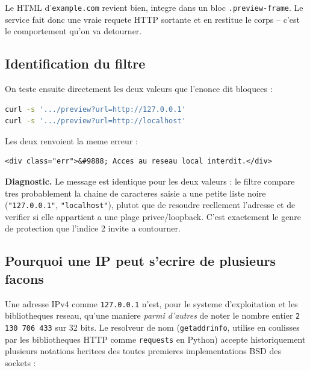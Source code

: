 \documentclass[11pt,a4paper]{article}
\begin{document}
Le HTML d'\texttt{example.com} revient bien, integre dans un bloc
\texttt{.preview-frame}. Le service fait donc une vraie requete HTTP
sortante et en restitue le corps -- c'est le comportement qu'on va
detourner.

\subsection{Identification du filtre}

On teste ensuite directement les deux valeurs que l'enonce dit bloquees :

\begin{lstlisting}[language=bash]
curl -s '.../preview?url=http://127.0.0.1'
curl -s '.../preview?url=http://localhost'
\end{lstlisting}

Les deux renvoient la meme erreur :

\begin{lstlisting}
<div class="err">&#9888; Acces au reseau local interdit.</div>
\end{lstlisting}

\begin{noteok}
\textbf{Diagnostic.} Le message est identique pour les deux valeurs : le
filtre compare tres probablement la chaine de caracteres saisie a une
petite liste noire (\texttt{"127.0.0.1"}, \texttt{"localhost"}), plutot
que de resoudre reellement l'adresse et de verifier si elle appartient a
une plage privee/loopback. C'est exactement le genre de protection que
l'indice 2 invite a contourner.
\end{noteok}

\subsection{Pourquoi une IP peut s'ecrire de plusieurs facons}

Une adresse IPv4 comme \texttt{127.0.0.1} n'est, pour le systeme
d'exploitation et les bibliotheques reseau, qu'une maniere \emph{parmi
d'autres} de noter le nombre entier \texttt{2\,130\,706\,433} sur 32 bits.
Le resolveur de nom (\texttt{getaddrinfo}, utilise en coulisses par les
bibliotheques HTTP comme \texttt{requests} en Python) accepte
historiquement plusieurs notations heritees des toutes premieres
implementations BSD des sockets :
\end{document}

